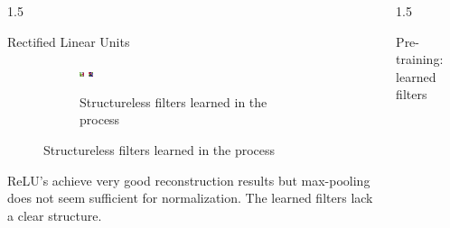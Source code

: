 \documentclass[final]{beamer}
\newlength{\onecolwid}
\newlength{\threecolwid}
\begin{document}
\begin{frame}[t]
\begin{columns}[t]
\begin{column}{\threecolwid}
\begin{columns}[t, totalwidth=\threecolwid]
\begin{column}{1.5\onecolwid}
\begin{alertblock}{Rectified Linear Units}
\begin{figure}
\begin{subfigure}{0.4\linewidth}
			\includegraphics[width=0.1\linewidth]{graphics/reconstructions/cifar/relu/relu_filter_07.png} \hspace{0.05\linewidth}
			\includegraphics[width=0.1\linewidth]{graphics/reconstructions/cifar/relu/relu_filter_08.png} 

			\caption{Structureless filters learned in the process}

		\end{subfigure}


	\end{figure}

	ReLU's achieve very good reconstruction results but max-pooling does not seem sufficient for normalization. The learned filters lack a clear structure.

\end{alertblock}

\end{column}

\begin{column}{1.5\onecolwid}

	\begin{alertblock}{Pre-training: learned filters}

		\begin{figure}
		\centering


\end{figure}
\end{alertblock}
\end{column}
\end{columns}
\end{column}
\end{columns}
\end{frame}
\end{document}
